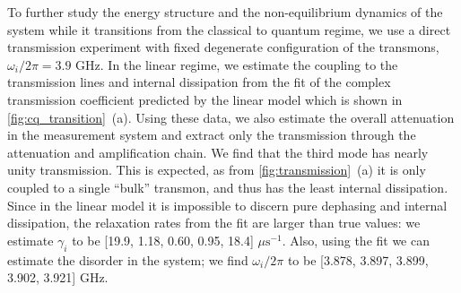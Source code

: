 \documentclass[%
 aps, pra,
 amsmath,amssymb,
 reprint,%
superscriptaddress
]{revtex4-2}
\begin{document}
To further study the energy structure and the non-equilibrium dynamics of the system while it transitions from the classical to quantum regime, we use a direct transmission experiment with fixed degenerate configuration of the transmons, $\omega_i/2\pi = 3.9$ GHz. In the linear regime, we estimate the coupling to the transmission lines and internal dissipation from the fit of the complex transmission coefficient predicted by the linear model which is shown in \autoref{fig:cq_transition}~(a). Using these data, we also estimate the overall attenuation in the measurement system and extract only the transmission through the attenuation and amplification chain. We find that the third mode has nearly unity transmission. This is expected, as from \autoref{fig:transmission}~(a) it is only coupled to a single ``bulk'' transmon, and thus has the least internal dissipation. Since in the linear model it is impossible to discern pure dephasing and internal dissipation, the relaxation rates from the fit are larger than true values: we estimate $\gamma_i$ to be [19.9, 1.18, 0.60, 0.95, 18.4] $\mu\text{s}^{-1}$. Also, using the fit we can estimate the disorder in the system; we find $\omega_i/2\pi$ to be [3.878, 3.897, 3.899, 3.902, 3.921] GHz. 
\end{document}
